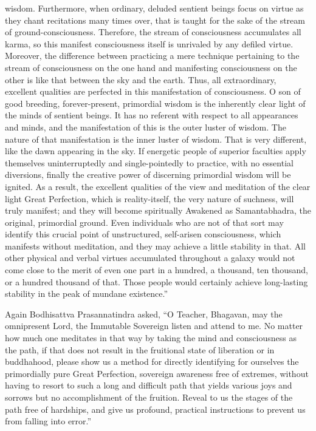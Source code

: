 \documentclass[a4paper,11pt,twoside,final]{book}
\begin{document}
wisdom. Furthermore, when ordinary, deluded sentient beings focus on
virtue as they chant recitations many times over, that is taught for
the sake of the stream of ground-consciousness. Therefore, the stream
of consciousness accumulates all karma, so this manifest consciousness
itself is unrivaled by any defiled virtue. Moreover, the difference
between practicing a mere technique pertaining to the stream of
consciousness on the one hand and manifesting consciousness on the
other is like that between the sky and the earth. Thus, all
extraordinary, excellent qualities are perfected in this manifestation
of consciousness.  O son of good breeding, forever-present, primordial
wisdom is the inherently clear light of the minds of sentient
beings. It has no referent with respect to all appearances and minds,
and the manifestation of this is the outer luster of wisdom. The
nature of that manifestation is the inner luster of wisdom. That is
very different, like the dawn appearing in the sky. If energetic
people of superior faculties apply themselves uninterruptedly and
single-pointedly to practice, with no essential diversions, finally
the creative power of discerning primordial wisdom will be ignited. As
a result, the excellent qualities of the view and meditation of the
clear light Great Perfection, which is reality-itself, the very nature
of suchness, will truly manifest; and they will become spiritually
Awakened as Samantabhadra, the original, primordial ground. Even
individuals who are not of that sort may identify this crucial point
of unstructured, self-arisen consciousness, which manifests without
meditation, and they may achieve a little stability in that. All other
physical and verbal virtues accumulated throughout a galaxy would not
come close to the merit of even one part in a hundred, a thousand, ten
thousand, or a hundred thousand of that. Those people would certainly
achieve long-lasting stability in the peak of mundane existence.''

Again Bodhisattva Prasannatindra asked, ``O Teacher, Bhagavan, may the
omnipresent Lord, the Immutable Sovereign listen and attend to me. No
matter how much one meditates in that way by taking the mind and
consciousness as the path, if that does not result in the fruitional
state of liberation or in buddhahood, please show us a method for
directly identifying for ourselves the primordially pure Great
Perfection, sovereign awareness free of extremes, without having to
resort to such a long and difficult path that yields various joys and
sorrows but no accomplishment of the fruition. Reveal to us the stages
of the path free of hardships, and give us profound, practical
instructions to prevent us from falling into error.''
\end{document}
